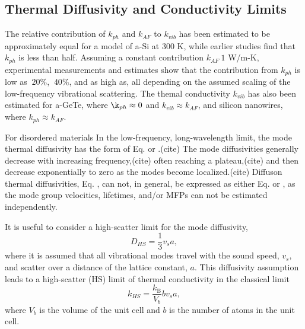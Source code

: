 \documentclass[aps,prb,twocolumn,superscriptaddress,footinbib,amsmath,amssymb,floatfix]{revtex4}
\begin{document}
\subsection{\label{S:Limits}Thermal Diffusivity and Conductivity Limits}

The relative contribution of $k_{ph}$ and $k_{AF}$ to $k_{vib}$ 
has been estimated 
to be approximately equal for a model of a-Si  
at 300 K,\cite{he_heat_2011} 
while earlier studies find that $k_{ph}$ is less than half.
\cite{feldman_thermal_1993,
feldman_numerical_1999} Assuming a constant contribution  
$k_{AF} ~ 1$ W/m-K, experimental 
measurements and estimates show that the contribution from 
$k_{ph}$ is low as $~20\%$,
\cite{cahill_thermal_1994,feldman_numerical_1999} 
$~40\%$,\cite{liu_high_2009} and as high as,
\cite{yang_anomalously_2010} all depending on the assumed 
scaling of the low-frequency vibrational scattering. 
The themal conductivity $k_{vib}$ has also been estimated for 
a-GeTe\cite{sosso_thermal_2012}, where $\k_{ph}\approx 0$ and 
$k_{vib} \approx k_{AF}$, and silicon nanowires,
\cite{donadio_atomistic_2009} where $k_{ph}\approx k_{AF}$. 

For disordered materials In the low-frequency, long-wavelength limit, 
the mode thermal diffusivity 
has the form of Eq. or .(cite)  The mode diffusivities 
generally decrease with increasing frequency,(cite) often reaching a 
plateau,(cite) and then decrease exponentially to zero as the modes become 
localized.(cite) Diffuson thermal diffusivities, Eq. , can not, 
in general, be 
expressed as either Eq. or , as the mode group velocities, 
lifetimes, and/or MFPs can not be estimated independently.
\cite{allen_thermal_1993,feldman_thermal_1993,
feldman_numerical_1999,allen_evolution_1998}

It is useful to consider a high-scatter limit for the mode diffusivity,
\begin{equation}\label{EQ:D_HS}
D_{HS} = \frac{1}{3} v_s a,
\end{equation}
where it is assumed that all vibrational modes travel with the sound speed, 
$v_s$, and scatter over a distance of the lattice constant, $a$. This 
diffusivity assumption leads to a high-scatter (HS) limit of thermal 
conductivity in the classical limit\cite{cahill_lattice_1988} 
\begin{equation}\label{EQ:k_HS}
k_{HS} = \frac{k_{\text{B}}}{V_b}b v_s a,
\end{equation}
where $V_b$ is the volume of the unit cell and $b$ is the number of atoms 
in the unit cell. 
\end{document}

